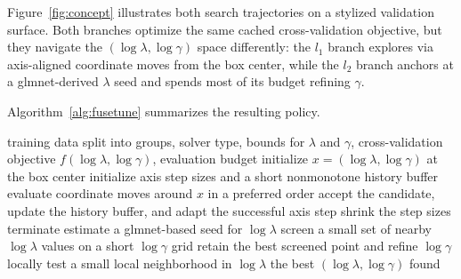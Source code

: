 \documentclass[pdflatex,iicol,sn-mathphys-num]{sn-jnl}
\newcommand{\method}{\textsc{FuseTune}}
\def\textsc#1{#1}%
\def\texttt#1{#1}%
\def\method{FuseTune}%
\def\ell{l}%
\begin{document}
Figure~\ref{fig:concept} illustrates both search trajectories on a stylized validation surface. Both branches optimize the same cached cross-validation objective, but they navigate the \((\log\lambda,\log\gamma)\) space differently: the \(\ell_1\) branch explores via axis-aligned coordinate moves from the box center, while the \(\ell_2\) branch anchors at a \texttt{glmnet}-derived \(\lambda\) seed and spends most of its budget refining \(\gamma\).

Algorithm~\ref{alg:fusetune} summarizes the resulting policy.

\begin{algorithm}[t]
\caption{\method{}}
\label{alg:fusetune}
\begin{algorithmic}[1]
\Require training data split into groups, solver type, bounds for \(\lambda\) and \(\gamma\), cross-validation objective \(f(\log\lambda,\log\gamma)\), evaluation budget
\If{solver is \(\ell_1\)}
  \State initialize \(x=(\log\lambda,\log\gamma)\) at the box center
  \State initialize axis step sizes and a short nonmonotone history buffer
    \State evaluate coordinate moves around \(x\) in a preferred order
      \State accept the candidate, update the history buffer, and adapt the successful axis step
    \Else
      \State shrink the step sizes
    \EndIf
      \State terminate
    \EndIf
  \EndWhile
\Else
  \State estimate a \texttt{glmnet}-based seed for \(\log\lambda\)
  \State screen a small set of nearby \(\log\lambda\) values on a short \(\log\gamma\) grid
  \State retain the best screened point and refine \(\log\gamma\) locally
    \State test a small local neighborhood in \(\log\lambda\)
  \EndIf
\EndIf
\State \Return the best \((\log\lambda,\log\gamma)\) found
\end{algorithmic}
\end{algorithm}
\end{document}
